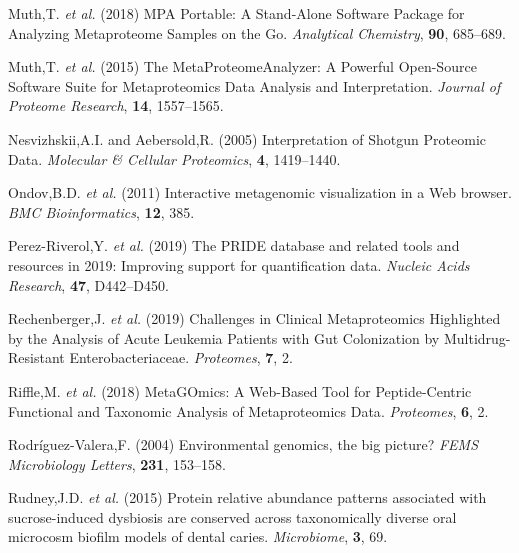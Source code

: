 \begin{CSLReferences}{1}{0}
\leavevmode\hypertarget{ref-muthMPAPortableStandAlone2018}{}%
Muth,T. \emph{et al.} (2018) {MPA Portable}: {A Stand-Alone Software
Package} for {Analyzing Metaproteome Samples} on the {Go}.
\emph{Analytical Chemistry}, \textbf{90}, 685--689.

\leavevmode\hypertarget{ref-muthMetaProteomeAnalyzerPowerfulOpenSource2015}{}%
Muth,T. \emph{et al.} (2015) The {MetaProteomeAnalyzer}: {A Powerful
Open-Source Software Suite} for {Metaproteomics Data Analysis} and
{Interpretation}. \emph{Journal of Proteome Research}, \textbf{14},
1557--1565.

\leavevmode\hypertarget{ref-nesvizhskiiInterpretationShotgunProteomic2005}{}%
Nesvizhskii,A.I. and Aebersold,R. (2005) Interpretation of {Shotgun
Proteomic Data}. \emph{Molecular \& Cellular Proteomics}, \textbf{4},
1419--1440.

\leavevmode\hypertarget{ref-ondovInteractiveMetagenomicVisualization2011}{}%
Ondov,B.D. \emph{et al.} (2011) Interactive metagenomic visualization in
a {Web} browser. \emph{BMC Bioinformatics}, \textbf{12}, 385.

\leavevmode\hypertarget{ref-perez-riverolPRIDEDatabaseRelated2019}{}%
Perez-Riverol,Y. \emph{et al.} (2019) The {PRIDE} database and related
tools and resources in 2019: Improving support for quantification data.
\emph{Nucleic Acids Research}, \textbf{47}, D442--D450.

\leavevmode\hypertarget{ref-rechenbergerChallengesClinicalMetaproteomics2019}{}%
Rechenberger,J. \emph{et al.} (2019) Challenges in {Clinical
Metaproteomics Highlighted} by the {Analysis} of {Acute Leukemia
Patients} with {Gut Colonization} by {Multidrug-Resistant
Enterobacteriaceae}. \emph{Proteomes}, \textbf{7}, 2.

\leavevmode\hypertarget{ref-riffleMetaGOmicsWebBasedTool2018}{}%
Riffle,M. \emph{et al.} (2018) {MetaGOmics}: {A Web-Based Tool} for
{Peptide-Centric Functional} and {Taxonomic Analysis} of {Metaproteomics
Data}. \emph{Proteomes}, \textbf{6}, 2.

\leavevmode\hypertarget{ref-rodriguez-valeraEnvironmentalGenomicsBig2004}{}%
Rodríguez-Valera,F. (2004) Environmental genomics, the big picture?
\emph{FEMS Microbiology Letters}, \textbf{231}, 153--158.

\leavevmode\hypertarget{ref-rudneyProteinRelativeAbundance2015}{}%
Rudney,J.D. \emph{et al.} (2015) Protein relative abundance patterns
associated with sucrose-induced dysbiosis are conserved across
taxonomically diverse oral microcosm biofilm models of dental caries.
\emph{Microbiome}, \textbf{3}, 69.


\end{CSLReferences}
